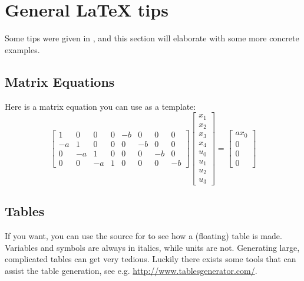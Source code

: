 \newcommand{\texMacro}[2]{\texttt{\textbackslash{#1}\{#2\}}}
\section{General LaTeX tips}\label{sec:latex_tips}
Some tips were given in , and this section will elaborate with some more concrete examples.

\subsection{Matrix Equations}
Here is a matrix equation you can use as a template:
\begin{equation}
	\begin{bmatrix}
		1 &  0 &  0 & 0 & -b &  0 &  0 &  0 \\
		-a &  1 &  0 & 0 &  0 & -b &  0 &  0 \\
		0 & -a &  1 & 0 &  0 &  0 & -b &  0 \\
		0 &  0 & -a & 1 &  0 &  0 &  0 & -b                                
	\end{bmatrix}
	\begin{bmatrix} x_1 \\ x_2 \\ x_3 \\ x_4 \\ u_0 \\ u_1 \\ u_2 \\ u_3 \end{bmatrix}
	=
	\begin{bmatrix}
		ax_0 \\ 0 \\ 0 \\ 0      
	\end{bmatrix}
\end{equation}

\subsection{Tables}
If you want, you can use the source for  to see how a (floating) table is made. Variables and symbols are always in italics, while units are not. Generating large, complicated tables can get very tedious. Luckily there exists some tools that can assist the table generation, see e.g. \url{http://www.tablesgenerator.com/}.



